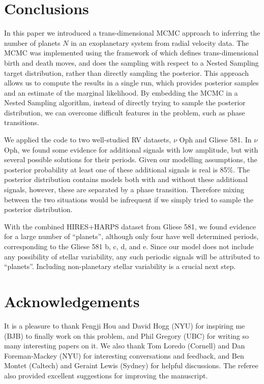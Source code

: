 \documentclass[useAMS,usenatbib]{mn2e}
\begin{document}
\section{Conclusions}
In this paper we introduced a trans-dimensional MCMC approach to inferring
the number of planets $N$ in an exoplanetary system from radial velocity data.
The MCMC was implemented using the framework of \citet{rjobject} which
defines trans-dimensional birth and death moves, and does the sampling
with respect to a Nested Sampling target distribution, rather than directly
sampling the posterior. This approach allows us to compute the results in a
single run, which provides posterior samples and an estimate of the marginal
likelihood. By embedding the MCMC in a Nested Sampling algorithm, instead of
directly trying to sample the posterior distribution, we can overcome difficult
features in the problem, such as phase transitions.

We applied the code to two well-studied RV datasets, $\nu$ Oph and Gliese 581.
In $\nu$ Oph, we found some evidence for additional signals with low amplitude,
but with several possible solutions for their periods. Given our modelling
assumptions, the posterior probability at least one of these additional signals
is real is 85\%. The posterior distribution contains models both with and without
these additional signals, however, these are separated by a phase transition.
Therefore mixing between the two situations would be infrequent if we simply
tried to sample the posterior distribution.

With the combined HIRES+HARPS dataset from Gliese 581, we found
evidence for a large number of ``planets'', although only four have well
determined periods, corresponding to the Gliese 581 b, c, d,
and e. Since our model does not include any possibility of stellar variability,
any such periodic signals will be attributed to ``planets''.
Including non-planetary stellar variability is a crucial next step.

\vspace{-0.5cm}
\section*{Acknowledgements}
It is a pleasure to thank Fengji Hou and David Hogg (NYU) for inspiring me (BJB) to
finally work on this problem, and Phil Gregory (UBC) for writing so many
interesting papers on it. We also thank Tom Loredo (Cornell) and Dan
Foreman-Mackey (NYU) for interesting conversations and feedback, and Ben
Montet (Caltech) and Geraint Lewis (Sydney) for helpful discussions.
The referee also provided excellent suggestions for improving the manuscript.
\end{document}
